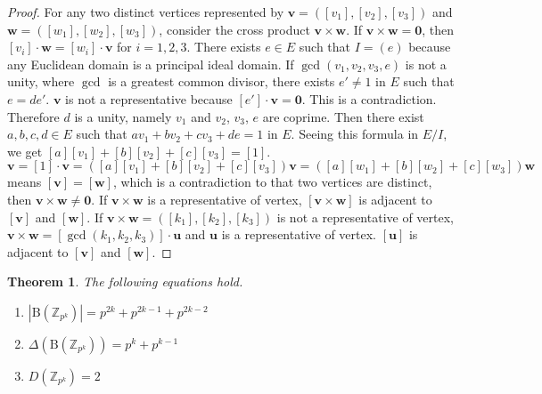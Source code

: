 \documentclass{article}
\newtheorem*{Th}{Theorem}
\newcommand{\Z}{\mathbb Z}
\newcommand{\B}{\mathrm{B}}
\begin{document}
\begin{proof}
For any two distinct vertices represented by $\bm v = ([v_1],[v_2],[v_3])$ and $\bm w=([w_1],[w_2],[w_3])$, consider the cross product $\bm v \times \bm w$. 
If $\bm v \times \bm w = \bm 0$, then $[v_i] \cdot \bm w = [w_i] \cdot \bm v$ for $i=1,2,3$. 
There exists $e \in E$ such that $I = (e)$ because any Euclidean domain is a principal ideal domain.
If $\gcd(v_1,v_2,v_3,e)$ is not a unity, where $\gcd$ is a greatest common divisor, 
there exists $e' \neq 1$ in $E$ such that $e=de'$. 
$\bm v$ is not a representative because $[e'] \cdot \bm v = \bm 0$. 
This is a contradiction. Therefore $d$ is a unity, namely $v_1$ and $v_2$, $v_3$, $e$ are coprime.
Then there exist $a, b, c, d \in E$ such that $ a v_1 + b v_2 + c v_3 + d e = 1$ in $E$.
Seeing this formula in $E/I$, we get $[a] [v_1] + [b] [v_2] + [c] [v_3] = [1]$.
\[ \bm v = [1] \cdot \bm v = ( [a] [v_1] + [b] [v_2] + [c] [v_3] ) \bm v = ( [a] [w_1] + [b] [w_2] + [c] [w_3] ) \bm w\]
means $[\bm v] = [\bm w]$, which is a contradiction to that two vertices are distinct, then $\bm v \times \bm w \neq \bm 0$. 
If $\bm v \times \bm w$ is a representative of vertex, $[\bm v \times \bm w]$ is adjacent to $[\bm v]$ and $[\bm w]$.
If $\bm v \times \bm w = ([k_1],[k_2],[k_3])$ is not a representative of vertex,
$\bm v \times \bm w = [\gcd(k_1,k_2,k_3)] \cdot \bm u$ and $\bm u$ is a representative of vertex. $[\bm u]$ is adjacent to $[\bm v]$ and $[\bm w]$.
\end{proof}

\begin{Th}\label{Th:main}
The following equations hold.
\begin{enumerate}
\item $ |\B(\Z_{p^k})| = p^{2k}+p^{2k-1}+p^{2k-2} $
\item $ \Delta(\B(\Z_{p^k})) = p^k + p^{k-1} $
\item $ D(\Z_{p^k}) = 2$
\end{enumerate}
\end{Th}
\end{document}
